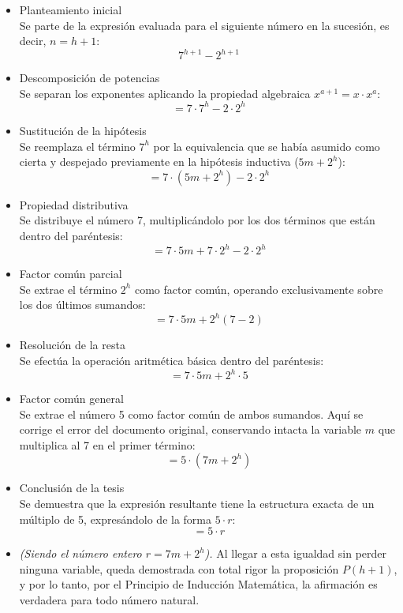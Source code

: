 \documentclass{article}
\begin{document}
\begin{itemize}
\item Planteamiento inicial\\
Se parte de la expresión evaluada para el siguiente número en la sucesión, es decir, $n = h+1$:
\[ 7^{h+1} - 2^{h+1} \]

\item Descomposición de potencias\\
Se separan los exponentes aplicando la propiedad algebraica $x^{a+1} = x \cdot x^a$:
\[ = 7 \cdot 7^h - 2 \cdot 2^h \]

\item Sustitución de la hipótesis\\
Se reemplaza el término $7^h$ por la equivalencia que se había asumido como cierta y despejado previamente en la hipótesis inductiva ($5m + 2^h$):
\[ = 7 \cdot (5m + 2^h) - 2 \cdot 2^h \]

\item Propiedad distributiva\\
Se distribuye el número 7, multiplicándolo por los dos términos que están dentro del paréntesis:
\[ = 7 \cdot 5m + 7 \cdot 2^h - 2 \cdot 2^h \]

\item Factor común parcial\\
Se extrae el término $2^h$ como factor común, operando exclusivamente sobre los dos últimos sumandos:
\[ = 7 \cdot 5m + 2^h (7 - 2) \]

\item Resolución de la resta\\
Se efectúa la operación aritmética básica dentro del paréntesis:
\[ = 7 \cdot 5m + 2^h \cdot 5 \]

\item Factor común general\\
Se extrae el número 5 como factor común de ambos sumandos. Aquí se corrige el error del documento original, conservando intacta la variable $m$ que multiplica al 7 en el primer término:
\[ = 5 \cdot (7m + 2^h) \]

\item Conclusión de la tesis\\
Se demuestra que la expresión resultante tiene la estructura exacta de un múltiplo de 5, expresándolo de la forma $5 \cdot r$:
\[ = 5 \cdot r \]

\item \textit{(Siendo el número entero $r = 7m + 2^h$).} Al llegar a esta igualdad sin perder ninguna variable, queda demostrada con total rigor la proposición $P(h+1)$, y por lo tanto, por el Principio de Inducción Matemática, la afirmación es verdadera para todo número natural.
\end{itemize}
\end{document}
